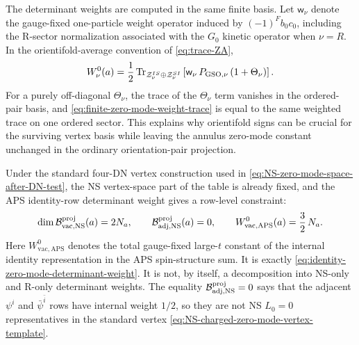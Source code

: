\documentclass[11pt]{article}
\newcommand{\Tr}{\operatorname{Tr}}
\newcommand{\vac}{\mathrm{vac}}
\newcommand{\NS}{\mathrm{NS}}
\begin{document}
The determinant weights are computed in the same finite basis. Let \(\mathsf w_\nu\) denote the
gauge-fixed one-particle weight operator induced by \((-1)^F b_0c_0\), including the R-sector
normalization associated with the \(G_0\) kinetic operator when \(\nu=R\). In the orientifold-average
convention of \eqref{eq:trace-ZA},
\begin{equation}
  W_\nu^0(a)
  =
  \frac12
  \Tr_{\mathcal Z_\nu^{IS}\oplus\mathcal Z_\nu^{SI}}
  \left[
    \mathsf w_\nu\,P_{{\rm GSO},\nu}\,(1+\Theta_\nu)
  \right].
  \label{eq:finite-zero-mode-weight-trace}
\end{equation}
For a purely off-diagonal \(\Theta_\nu\), the trace of the \(\Theta_\nu\) term vanishes in the
ordered-pair basis, and \eqref{eq:finite-zero-mode-weight-trace} is equal to the same weighted
trace on one ordered sector. This explains why orientifold signs can be crucial for the
surviving vertex basis while leaving the annulus zero-mode constant unchanged
in the ordinary orientation-pair projection.

Under the standard four-DN vertex construction used in
\eqref{eq:NS-zero-mode-space-after-DN-test}, the NS vertex-space part of the table is already
fixed, and the APS identity-row determinant weight gives a row-level constraint:
\begin{equation}
  \dim \mathcal B_{\vac,\NS}^{\rm proj}(a)=2N_a,
  \qquad
  \mathcal B_{\rm adj,\NS}^{\rm proj}(a)=0,
  \qquad
  W_{\vac,\mathrm{APS}}^{0}(a)=\frac32\,N_a.
  \label{eq:NS-zero-mode-weights-fixed}
\end{equation}
Here \(W_{\vac,\mathrm{APS}}^{0}\) denotes the total gauge-fixed large-\(t\) constant of the
internal identity representation in the APS spin-structure sum. It is exactly
\eqref{eq:identity-zero-mode-determinant-weight}. It is not, by itself, a decomposition into
NS-only and R-only determinant weights. The equality
\(\mathcal B_{\rm adj,\NS}^{\rm proj}=0\) says that the adjacent \(\psi^i\) and
\(\bar\psi^{\bar i}\) rows have internal weight \(1/2\), so they are not NS \(L_0=0\)
representatives in the standard vertex \eqref{eq:NS-charged-zero-mode-vertex-template}.
\end{document}
